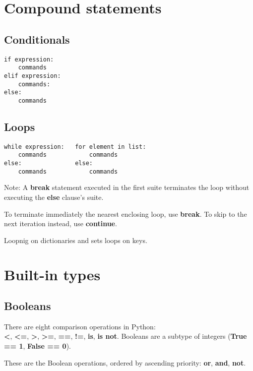 \documentclass[a4paper, twoside, 8pt]{extarticle}
\newcommand{\python}[1] {\textbf{\color{blue}#1}}
\begin{document}
\renewcommand{\footrulewidth}{0.4pt}

\begin{multicols*}{3}
\raggedright
\section{Compound statements}
\subsection{Conditionals}
\begin{verbatim}
if expression:
    commands
elif expression:
    commands:
else:
    commands
\end{verbatim}

\subsection{Loops}
\begin{verbatim}
while expression:   for element in list:
    commands            commands
else:               else:
    commands            commands
\end{verbatim}

Note: A \python{break} statement executed in the first suite terminates 
the loop without executing the \python{else} clause's suite.

To terminate immediately the nearest enclosing loop, use \python{break}.
To skip to the next iteration instead, use \python{continue}.

Loopnig on dictionaries and sets loops on keys.

\section{Built-in types}
\subsection{Booleans}
There are eight comparison operations in Python: \\
\python{<}, \python{<=}, \python{>}, \python{>=}, 
\python{==}, \python{!=}, \python{is}, \python{is not}.
Booleans are a subtype of integers (\python{True == 1}, \python{False == 0}).

These are the Boolean operations, ordered by ascending priority: \python{or},
\python{and}, \python{not}.


\end{multicols*}
\end{document}
